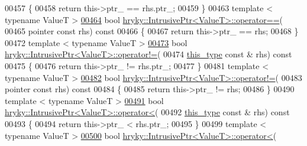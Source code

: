 \begin{DoxyCode}
00457 \textcolor{keyword}{}\{
00458     \textcolor{keywordflow}{return} this->ptr\_ == rhs.ptr\_;
00459 \}
00463 \textcolor{keyword}{template} < \textcolor{keyword}{typename} ValueT >
\hypertarget{intrusive__ptr_8h_source_l00464}{}\hyperlink{classhryky_1_1_intrusive_ptr_a8bc19fcb51130f7acfc810eddd01b1e7}{00464} \textcolor{keywordtype}{bool} \hyperlink{namespacehryky_a96bfe0df0a09db56e7253330de4f2243}{hryky::IntrusivePtr<ValueT>::operator==}(
00465     pointer \textcolor{keyword}{const} rhs)\textcolor{keyword}{ const}
00466 \textcolor{keyword}{}\{
00467     \textcolor{keywordflow}{return} this->ptr\_ == rhs;
00468 \}
00472 \textcolor{keyword}{template} < \textcolor{keyword}{typename} ValueT >
\hypertarget{intrusive__ptr_8h_source_l00473}{}\hyperlink{classhryky_1_1_intrusive_ptr_a8c2429282077ad6eeeaff6f225921190}{00473} \textcolor{keywordtype}{bool} \hyperlink{namespacehryky_af83d27d9a54004f5981499e910bb7cb8}{hryky::IntrusivePtr<ValueT>::operator!=}(
00474     \hyperlink{classhryky_1_1_intrusive_ptr}{this_type} \textcolor{keyword}{const} & rhs)\textcolor{keyword}{ const}
00475 \textcolor{keyword}{}\{
00476     \textcolor{keywordflow}{return} this->ptr\_ != rhs.ptr\_;
00477 \}
00481 \textcolor{keyword}{template} < \textcolor{keyword}{typename} ValueT >
\hypertarget{intrusive__ptr_8h_source_l00482}{}\hyperlink{classhryky_1_1_intrusive_ptr_a4850219e0e09bbb1a03a85db369469f8}{00482} \textcolor{keywordtype}{bool} \hyperlink{namespacehryky_af83d27d9a54004f5981499e910bb7cb8}{hryky::IntrusivePtr<ValueT>::operator!=}(
00483     pointer \textcolor{keyword}{const} rhs)\textcolor{keyword}{ const}
00484 \textcolor{keyword}{}\{
00485     \textcolor{keywordflow}{return} this->ptr\_ != rhs;
00486 \}
00490 \textcolor{keyword}{template} < \textcolor{keyword}{typename} ValueT >
\hypertarget{intrusive__ptr_8h_source_l00491}{}\hyperlink{classhryky_1_1_intrusive_ptr_ae0aa24c2d96b9db5d254280844c21272}{00491} \textcolor{keywordtype}{bool} \hyperlink{namespacehryky_a7db2acd798ff6883387f9cbe3b3e820d}{hryky::IntrusivePtr<ValueT>::operator<}(
00492     \hyperlink{classhryky_1_1_intrusive_ptr}{this_type} \textcolor{keyword}{const} & rhs)\textcolor{keyword}{ const}
00493 \textcolor{keyword}{}\{
00494     \textcolor{keywordflow}{return} this->ptr\_ < rhs.ptr\_;
00495 \}
00499 \textcolor{keyword}{template} < \textcolor{keyword}{typename} ValueT >
\hypertarget{intrusive__ptr_8h_source_l00500}{}\hyperlink{classhryky_1_1_intrusive_ptr_aa304734f29507d58aae31e346e13d0ae}{00500} \textcolor{keywordtype}{bool} \hyperlink{namespacehryky_a7db2acd798ff6883387f9cbe3b3e820d}{hryky::IntrusivePtr<ValueT>::operator<}(

\end{DoxyCode}
